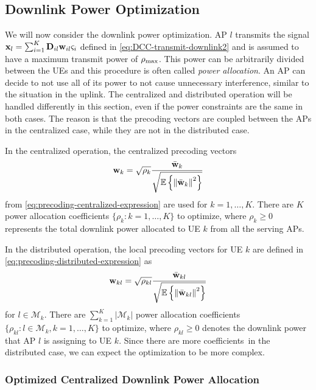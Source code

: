 \subsection{Downlink Power Optimization}
\label{sec:optimized-power-allocation-downlink}

We will now consider the downlink power optimization. AP $l$ transmits the signal $\mathbf{x}_l =  \sum_{i=1}^{K} \mathbf{D}_{il}  \mathbf{w}_{il} \varsigma_i $ defined in \eqref{eq:DCC-transmit-downlink2} and is assumed to have a maximum transmit power of $\rho_{\textrm{max}}$. This power can be arbitrarily divided between the UEs and this procedure is often called \emph{power allocation}. An AP can decide to not use all of its power to not cause unnecessary interference, similar to the situation in the uplink. 
The centralized and distributed operation will be handled differently in this section, even if the power constraints are the same in both cases. The reason is that the precoding vectors are coupled between the APs in the centralized case, while they are not in the distributed case.

In the centralized operation, the centralized precoding vectors
\begin{equation}
\mathbf{w}_k = \sqrt{\rho_k} \frac{\bar{\mathbf{w}}_k}{\sqrt{\mathbb{E} \left\{ \left\| \bar{\mathbf{w}}_k \right\|^2 \right\} }}
\end{equation}
from \eqref{eq:precoding-centralized-expression} are used for $k=1,\ldots,K$. There are $K$ power allocation coefficients $\{\rho_k:k=1,\ldots,K\}$ to optimize, where $\rho_k \geq 0$ represents the total downlink power allocated to UE $k$ from all the serving APs.

In the distributed operation, the local precoding vectors for UE $k$ are defined in \eqref{eq:precoding-distributed-expression}  as
\begin{equation}
{\mathbf{w}}_{kl}= \sqrt{\rho_{kl}}\frac{\bar{\mathbf{w}}_{kl}}{\sqrt{\mathbb{E}\left\{\left\| \bar{\mathbf{w}}_{kl}\right\|^2\right\}}}
\end{equation}
for $l \in \mathcal{M}_k$. There are $\sum_{k=1}^K |\mathcal{M}_k|$ power allocation coefficients $\{\rho_{kl} : l\in \mathcal{M}_k, k=1,\ldots,K\}$ to optimize, where $\rho_{kl} \geq 0$ denotes the downlink  power that AP $l$ is assigning to UE $k$. 
Since there are more coefficients~in the distributed case, we can expect the optimization to be more complex.

\enlargethispage{\baselineskip}

\subsubsection{Optimized Centralized Downlink Power Allocation}
\label{sec:optimized-power-allocation-downlink-scheme1}


